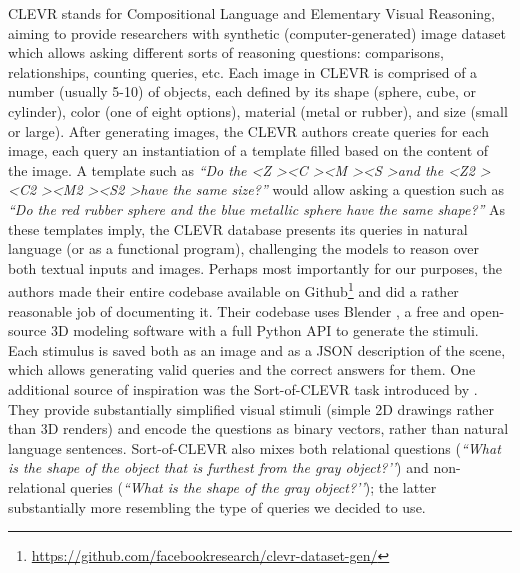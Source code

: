 CLEVR stands for Compositional Language and Elementary Visual Reasoning, aiming to provide researchers with synthetic (computer-generated) image dataset which allows asking different sorts of reasoning questions: comparisons, relationships, counting queries, etc. Each image in CLEVR is comprised of a number (usually 5-10) of objects, each defined by its shape (sphere, cube, or cylinder), color (one of eight options), material (metal or rubber), and size (small or large). After generating images, the CLEVR authors create queries for each image, each query an instantiation of a template filled based on the content of the image. A template such as \textit{``Do the \textless Z \textgreater \textless C \textgreater \textless M \textgreater \textless S \textgreater and the \textless Z2 \textgreater \textless C2 \textgreater \textless M2 \textgreater \textless S2 \textgreater have the same size?''} would allow asking a question such as \textit{``Do the red rubber sphere and the blue metallic sphere have the same shape?''} As these templates imply, the CLEVR database presents its queries in natural language (or as a functional program), challenging the models to reason over both textual inputs and images. Perhaps most importantly for our purposes, the authors made their entire codebase available on Github\footnote{\url{https://github.com/facebookresearch/clevr-dataset-gen/}} and did a rather reasonable job of documenting it. Their codebase uses Blender \parencite{BlenderOnlineCommunity2018}, a free and open-source 3D modeling software with a full Python API to generate the stimuli. Each stimulus is saved both as an image and as a JSON description of the scene, which allows generating valid queries and the correct answers for them. One additional source of inspiration was the Sort-of-CLEVR task introduced by \textcite{Santoro}. They provide substantially simplified visual stimuli (simple 2D drawings rather than 3D renders) and encode the questions as binary vectors, rather than natural language sentences. Sort-of-CLEVR also mixes both relational questions (\textit{``What is the shape of the object that is furthest from the gray object?’’}) and non-relational queries (\textit{``What is the shape of the gray object?’’}); the latter substantially more resembling the type of queries we decided to use.

